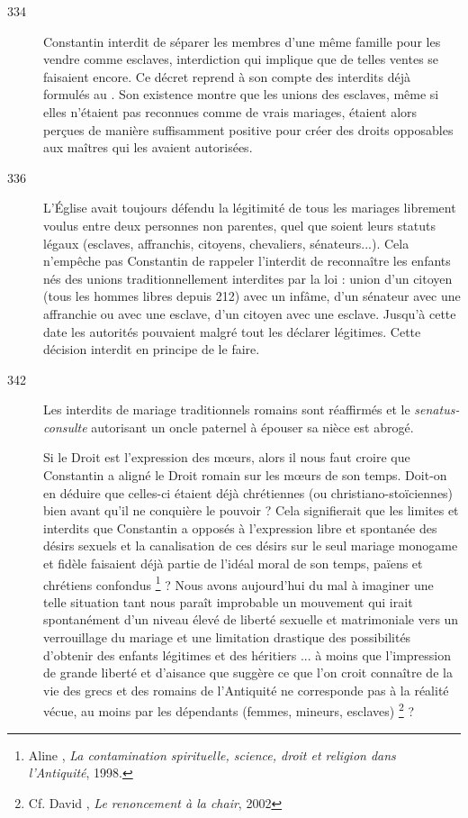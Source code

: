 \begin{description}
\item[334] Constantin interdit de séparer les membres d'une même famille pour les vendre comme esclaves, interdiction qui implique que de telles ventes se faisaient encore. Ce décret reprend à son compte des interdits déjà formulés au . Son existence montre que les unions des esclaves, même si elles n'étaient pas reconnues comme de vrais mariages, étaient alors perçues de manière suffisamment positive pour créer des droits opposables aux maîtres qui les avaient autorisées. 

\item[336] L'Église avait toujours défendu la légitimité de tous les mariages librement voulus entre deux personnes non parentes, quel que soient leurs statuts légaux (esclaves, affranchis, citoyens, chevaliers, sénateurs...). Cela n'empêche pas Constantin de rappeler l'interdit de reconnaître les enfants nés des unions traditionnellement interdites par la loi : union d'un citoyen (tous les hommes libres depuis 212) avec un infâme, d'un sénateur avec une affranchie ou avec une esclave, d'un citoyen avec une esclave. Jusqu'à cette date les autorités pouvaient malgré tout les déclarer légitimes. Cette décision interdit en principe de le faire. 

\item[342] Les interdits de mariage traditionnels romains sont réaffirmés et le \emph{senatus-consulte} autorisant un oncle paternel à épouser sa nièce est abrogé.

 Si le Droit est l'expression des mœurs, alors il nous faut croire que Constantin a aligné le Droit romain sur les mœurs de son temps. Doit-on en déduire que celles-ci étaient déjà chrétiennes (ou christiano-stoïciennes) bien avant qu'il ne conquière le pouvoir ? Cela signifierait que les limites et interdits que Constantin a opposés à l'expression libre et spontanée des désirs sexuels et la canalisation de ces désirs sur le seul mariage monogame et fidèle faisaient déjà partie de l'idéal moral de son temps, païens et chrétiens confondus%
\footnote{Aline , \emph{La contamination spirituelle, science, droit et religion dans l'Antiquité}, 1998.} 
 ? Nous avons aujourd'hui du mal à imaginer une telle situation tant nous paraît improbable un mouvement qui irait spontanément d'un niveau élevé de liberté sexuelle et matrimoniale vers un verrouillage du mariage et une limitation drastique des possibilités d'obtenir des enfants légitimes et des héritiers ... à moins que l'impression de grande liberté et d'aisance que suggère ce que l'on croit connaître de la vie des grecs et des romains de l'Antiquité ne corresponde pas à la réalité vécue, au moins par les dépendants (femmes, mineurs, esclaves)%
\footnote{Cf. David , \emph{Le renoncement à la chair}, 2002} 
 ? 


\end{description}
